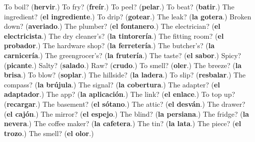 \begin{tcolorbox}[breakable,colback=teal!4,colframe=teal!35!black,title={Before you move on}]
To boil? (\textbf{hervir}.) To fry? (\textbf{freír}.) To peel? (\textbf{pelar}.) To beat? (\textbf{batir}.) The ingredient? (\textbf{el ingrediente}.) To drip? (\textbf{gotear}.) The leak? (\textbf{la gotera}.) Broken down? (\textbf{averiado}.) The plumber? (\textbf{el fontanero}.) The electrician? (\textbf{el electricista}.) The dry cleaner's? (\textbf{la tintorería}.) The fitting room? (\textbf{el probador}.) The hardware shop? (\textbf{la ferretería}.) The butcher's? (\textbf{la carnicería}.) The greengrocer's? (\textbf{la frutería}.) The taste? (\textbf{el sabor}.) Spicy? (\textbf{picante}.) Salty? (\textbf{salado}.) Raw? (\textbf{crudo}.) To smell? (\textbf{oler}.) The breeze? (\textbf{la brisa}.) To blow? (\textbf{soplar}.) The hillside? (\textbf{la ladera}.) To slip? (\textbf{resbalar}.) The compass? (\textbf{la brújula}.) The signal? (\textbf{la cobertura}.) The adapter? (\textbf{el adaptador}.) The app? (\textbf{la aplicación}.) The link? (\textbf{el enlace}.) To top up? (\textbf{recargar}.) The basement? (\textbf{el sótano}.) The attic? (\textbf{el desván}.) The drawer? (\textbf{el cajón}.) The mirror? (\textbf{el espejo}.) The blind? (\textbf{la persiana}.) The fridge? (\textbf{la nevera}.) The coffee maker? (\textbf{la cafetera}.) The tin? (\textbf{la lata}.) The piece? (\textbf{el trozo}.) The smell? (\textbf{el olor}.)
\end{tcolorbox}
